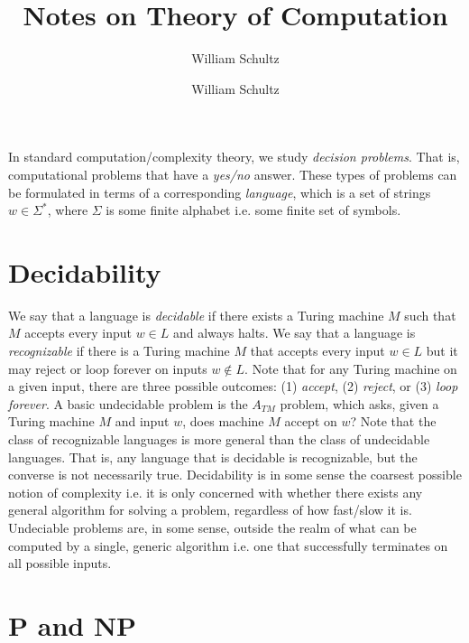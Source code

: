 \documentclass[10pt,a4paper]{article}
\author{William Schultz}
\begin{document}
\title{Notes on Theory of Computation}
\author{William Schultz}
\maketitle

In standard computation/complexity theory, we study \textit{decision problems}. That is, computational problems that have a \textit{yes/no} answer. These types of problems can be formulated in terms of a corresponding \textit{language}, which is a set of strings $w \in \Sigma^*$, where $\Sigma$ is some finite alphabet i.e. some finite set of symbols.

\section{Decidability}

We say that a language is \textit{decidable} if there exists a Turing machine $M$ such that $M$ accepts every input $w \in L$ and always halts. We say that a language is \textit{recognizable} if there is a Turing machine $M$ that accepts every input $w \in L$ but it may reject or loop forever on inputs $w \notin L$. Note that for any Turing machine on a given input, there are three possible outcomes: (1) \textit{accept}, (2)  \textit{reject}, or (3) \textit{loop forever}. A basic undecidable problem is the $A_{TM}$ problem, which asks, given a Turing machine $M$ and input $w$, does machine $M$ accept on $w$? Note that the class of recognizable languages is more general than the class of undecidable languages. That is, any language that is decidable is recognizable, but the converse is not necessarily true. Decidability is in some sense the coarsest possible notion of complexity i.e. it is only concerned with whether there exists any general algorithm for solving a problem, regardless of how fast/slow it is. Undeciable problems are, in some sense, outside the realm of what can be computed by a single, generic algorithm i.e. one that successfully terminates on all possible inputs.

\section{P and NP}
\end{document}
